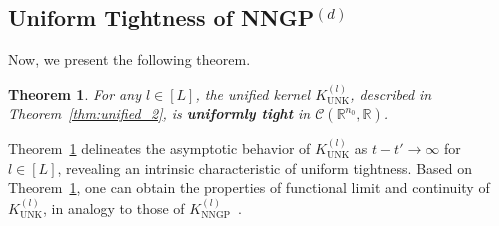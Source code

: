 \documentclass[review,10pt]{JMtemplate}
\newtheorem{theorem}{Theorem}
\begin{document}
\subsection{Uniform Tightness of NNGP$^{(d)}$}
Now, we present the following theorem.
\begin{theorem} \label{thm:asymptotic}
For any $l\in[L]$, the unified kernel $K_{\textrm{UNK}}^{(l)}$, described in Theorem~\ref{thm:unified_2}, is \textbf{uniformly tight} in $\mathcal{C}(\mathbb{R}^{n_0},\mathbb{R})$.
\end{theorem}
Theorem~\ref{thm:asymptotic} delineates the asymptotic behavior of $K_{\textrm{UNK}}^{(l)}$ as $t-t' \to \infty$ for $l\in[L]$, revealing an intrinsic characteristic of uniform tightness. Based on Theorem~\ref{thm:asymptotic}, one can obtain the properties of functional limit and continuity of $K_{\textrm{UNK}}^{(l)}$, in analogy to those of $K_{\textrm{NNGP}}^{(l)}$~\cite{bracale2020:asymptotic}.
\end{document}
